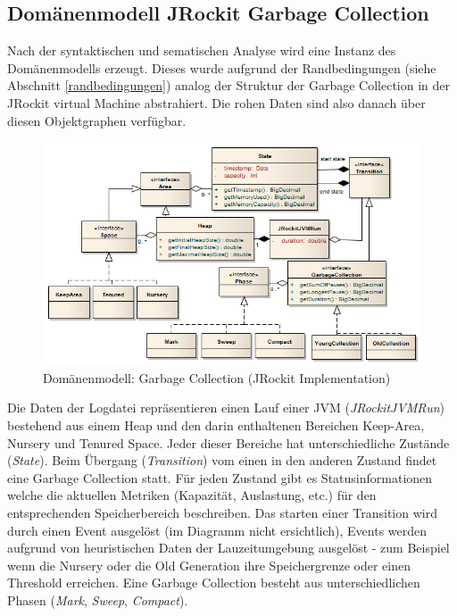 \subsection{Domänenmodell JRockit Garbage Collection}\label{jrockit_domain_model}
Nach der syntaktischen und sematischen Analyse wird eine Instanz des Domänenmodells erzeugt. Dieses wurde aufgrund der Randbedingungen (siehe Abschnitt \ref{randbedingungen}) analog der Struktur der Garbage Collection in der JRockit virtual Machine abstrahiert. Die rohen Daten sind also danach über diesen Objektgraphen verfügbar. \begin{landscape}
 \begin{figure}[H]
  	\centering
        	\includegraphics[width=18.2cm]{images/jrockit_extension_domain}
	\caption{Domänenmodell: Garbage Collection (JRockit Implementation)}
\end{figure}
\end{landscape}
Die Daten der Logdatei repräsentieren einen Lauf einer JVM (\textit{JRockitJVMRun}) bestehend aus einem Heap und den darin enthaltenen Bereichen Keep-Area, Nursery und Tenured Space. Jeder dieser Bereiche hat unterschiedliche Zustände (\textit{State}). Beim Übergang (\textit{Transition}) vom einen in den anderen Zustand findet eine Garbage Collection statt. Für jeden Zustand gibt es Statusinformationen welche die aktuellen Metriken (Kapazität, Auslastung, etc.) für den entsprechenden Speicherbereich beschreiben. Das starten einer Transition wird durch einen Event ausgelöst (im Diagramm nicht ersichtlich), Events werden aufgrund von heuristischen Daten der Lauzeitumgebung ausgelöst - zum Beispiel wenn die Nursery oder die Old Generation ihre Speichergrenze oder einen Threshold erreichen. Eine Garbage Collection besteht aus unterschiedlichen Phasen (\textit{Mark}, \textit{Sweep}, \textit{Compact}).

